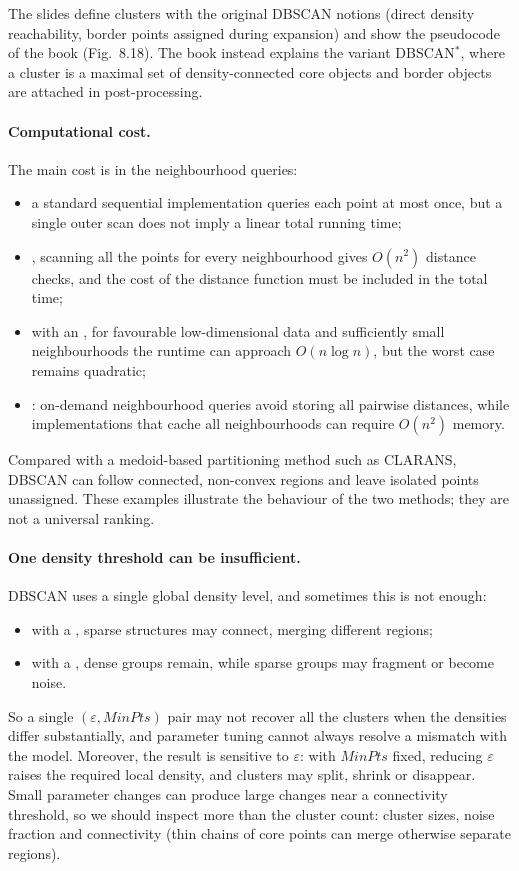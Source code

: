 \begin{remark}
The slides define clusters with the original DBSCAN notions (direct density reachability, border points assigned during expansion) and show the pseudocode of the book (Fig.~8.18). The book instead explains the variant DBSCAN$^*$, where a cluster is a maximal set of density-connected core objects and border objects are attached in post-processing.
\end{remark}

\paragraph{Computational cost.} The main cost is in the neighbourhood queries:
\begin{itemize}
  \item a standard sequential implementation queries each point at most once, but a single outer scan does not imply a linear total running time;
  \item {}, scanning all the points for every neighbourhood gives $O(n^2)$ distance checks, and the cost of the distance function must be included in the total time;
  \item with an , for favourable low-dimensional data and sufficiently small neighbourhoods the runtime can approach $O(n \log n)$, but the worst case remains quadratic;
  \item {}: on-demand neighbourhood queries avoid storing all pairwise distances, while implementations that cache all neighbourhoods can require $O(n^2)$ memory.
\end{itemize}

Compared with a medoid-based partitioning method such as CLARANS, DBSCAN can follow connected, non-convex regions and leave isolated points unassigned. These examples illustrate the behaviour of the two methods; they are not a universal ranking.

\paragraph{One density threshold can be insufficient.} DBSCAN uses a single global density level, and sometimes this is not enough:
\begin{itemize}
  \item with a , sparse structures may connect, merging different regions;
  \item with a , dense groups remain, while sparse groups may fragment or become noise.
\end{itemize}
So a single $(\varepsilon, MinPts)$ pair may not recover all the clusters when the densities differ substantially, and parameter tuning cannot always resolve a mismatch with the model. Moreover, the result is sensitive to $\varepsilon$: with $MinPts$ fixed, reducing $\varepsilon$ raises the required local density, and clusters may split, shrink or disappear. Small parameter changes can produce large changes near a connectivity threshold, so we should inspect more than the cluster count: cluster sizes, noise fraction and connectivity (thin chains of core points can merge otherwise separate regions).


